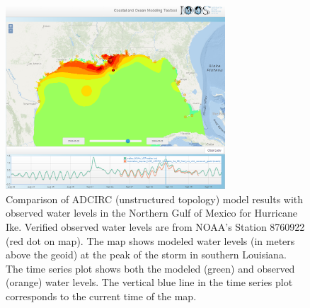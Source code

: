\begin{figure}[ht!]
  \centering
  \includegraphics[height=2.7in]{../figs/SciWMS_ModelObsComparison_crop_373_8_1052_879}
  \caption{Comparison of ADCIRC (unstructured topology) model results
    with observed water levels in the Northern Gulf of Mexico for
    Hurricane Ike. Verified observed water levels are from NOAA's
    Station 8760922 (red dot on map). The map shows modeled water
    levels (in meters above the geoid) at the peak of the storm in
    southern Louisiana. The time series plot shows both the modeled
    (green) and observed (orange) water levels. The vertical blue line
    in the time series plot corresponds to the current time of the
    map.}
  \label{fig:adcirc_comp}
\end{figure}

